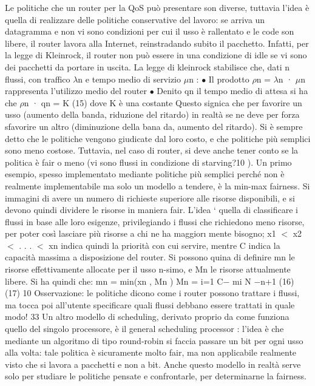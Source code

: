 Le politiche che un router per la QoS può presentare son diverse, tuttavia
l'idea è quella di realizzare delle politiche conservative del lavoro: se arriva un
datagramma e non vi sono condizioni per cui il usso è rallentato e le code son
libere, il router lavora alla Internet, reinstradando subito il pacchetto. Infatti,
per la legge di Kleinrock, il router non può essere in una condizione di idle se
vi sono dei pacchetti da portare in uscita. La legge di kleinrock stabilisce che,
dati n flussi, con traffico $\lambda$n e tempo medio di servizio $\mu$n :
$\bullet$ Il prodotto $\rho$n = $\lambda$n · $\mu$n rappresenta l'utilizzo medio del router
$\bullet$ Denito qn il tempo medio di attesa si ha che
$\rho$n · qn = K
(15)
dove K è una costante
Questo signica che per favorire un usso (aumento della banda, riduzione del
ritardo) in realtà se ne deve per forza sfavorire un altro (diminuzione della bana
da, aumento del ritardo).
Si è sempre detto che le politiche vengono giudicate dal loro costo, e che
politiche più semplici sono meno costose. Tuttavia, nel caso di router, si deve
anche tener conto se la politica è fair o meno (vi sono flussi in condizione di
starving?10 ).
Un primo esempio, spesso implementato mediante politiche più semplici
perché non è realmente implementabile ma solo un modello a tendere, è la
min-max fairness. Si immagini di avere un numero di richieste superiore alle
risorse disponibili, e si devono quindi dividere le risorse in maniera fair. L'idea
` quella di classificare i flussi in base alle loro esigenze, privilegiando i flussi che
richiedono meno risorse, per poter così lasciare più risorse a chi ne ha maggior\i{}
mente bisogno; x1 $<$ x2 $<$ . . . $<$ xn indica quindi la priorità con cui servire,
mentre C indica la capacità massima a disposizione del router. Si possono quina
di definire mn le risorse effettivamente allocate per il usso n-simo, e Mn le
risorse attualmente libere. Si ha quindi che:
mn = min(xn , Mn )
Mn =
i=1
C$-$
mi
N $-$n+1
(16)
(17)
10 Osservazione: le politiche dicono come i router possono trattare i flussi, ma tocca poi
all'utente specificare quali flussi debbano essere trattati in quale modo!
33
Un altro modello di scheduling, derivato proprio da come funziona quello del
singolo processore, è il general scheduling processor : l'idea è che mediante un
algoritmo di tipo round-robin si faccia passare un bit per ogni usso alla volta:
tale politica è sicuramente molto fair, ma non applicabile realmente visto che
si lavora a pacchetti e non a bit. Anche questo modello in realtà serve solo per
studiare le politiche pensate e confrontarle, per determinarne la fairness.

